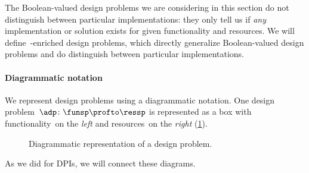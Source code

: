 The Boolean-valued design problems we are considering in this section do not distinguish between particular implementations: they only tell us if \emph{any} implementation or solution exists for given functionality and resources.
We will define~\Set-enriched design problems, which directly generalize Boolean-valued design problems and do distinguish between particular implementations.


\paragraph{Diagrammatic notation} We represent design problems using a diagrammatic notation.
One design problem~$\adp \colon \funsp \profto \ressp$ is represented as a box with functionality~\funsp on the \emph{left} and resources~\ressp on the \emph{right} (\cref{fig:diagrammaticdp}).
\begin{figure}[h!]
    \centering
    \caption{Diagrammatic representation of a design problem. }
    \label{fig:diagrammaticdp}
\end{figure}
As we did for DPIs, we will connect these diagrams.
